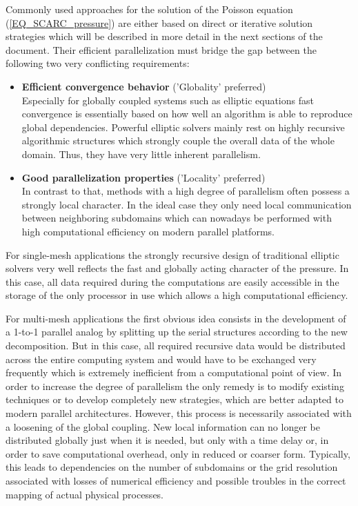 Commonly used approaches for the solution of the Poisson equation (\ref{EQ_SCARC_pressure}) 
are either based on direct or iterative solution strategies which will be described in more detail in the next sections of the document. Their efficient parallelization must bridge the gap between the following two very conflicting requirements:
\begin{itemize}
\item {\bf Efficient convergence behavior} ('Globality' preferred)\\
Especially for globally coupled systems such as elliptic equations fast convergence is essentially based on how well an algorithm is able to reproduce global dependencies. Powerful elliptic solvers mainly rest on highly recursive algorithmic structures which strongly couple the overall data of the whole domain. Thus, they have very little inherent parallelism. 
\item {\bf Good parallelization properties} ('Locality' preferred)\\
In contrast to that, methods with a high degree of parallelism often possess a strongly local character. In the ideal case they only need local communication between neighboring subdomains which can nowadays be performed with high computational efficiency on modern parallel platforms.  
\end{itemize}
 
For single-mesh applications the strongly recursive design of traditional elliptic solvers very well reflects the fast and globally acting character of the pressure. In this case, all data required during the computations are easily accessible in the storage of the only processor in use which allows a high computational efficiency. 

For multi-mesh applications the first obvious idea consists in the development of a 1-to-1 parallel analog by splitting up the serial structures according to the new decomposition. But in this case, all required recursive data would be distributed across the entire computing system and would have to be exchanged very frequently which is extremely inefficient from a computational point of view.
In order to increase the degree of parallelism the only remedy is to modify existing techniques or to develop completely new strategies, which are better adapted to modern parallel architectures. However, this process is necessarily associated with a loosening of the global coupling.
New local information can no longer be distributed globally just when it is needed, but only with a time delay or, in order to save computational overhead, only in  reduced or coarser form. Typically, this leads to dependencies on the number of subdomains or the grid resolution associated with losses of numerical efficiency and possible troubles in the correct mapping of actual physical processes. 

